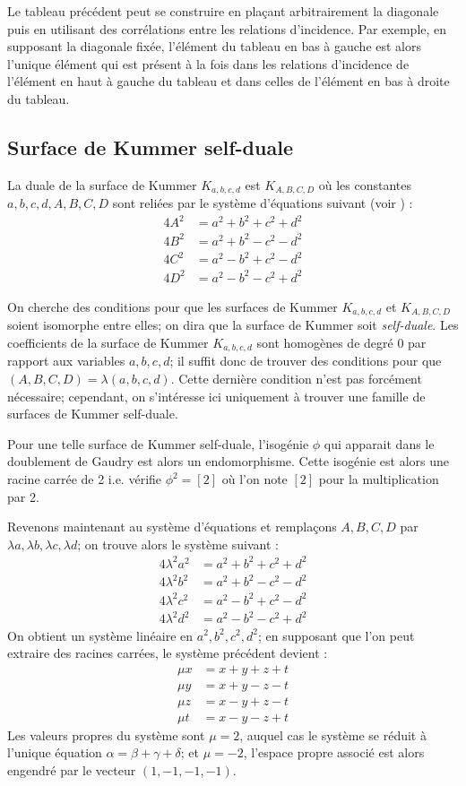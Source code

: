 \documentclass[a4paper]{article}
\theoremstyle{definition}
\theoremstyle{remark}
\numberwithin{equation}{section}
\begin{document}
Le tableau précédent peut se construire en plaçant arbitrairement la diagonale puis en utilisant des corrélations entre les relations d'incidence. Par exemple, en supposant la diagonale fixée, l'élément du tableau en bas à gauche est alors l'unique élément qui est présent à la fois dans les relations d'incidence de l'élément en haut à gauche du tableau et dans celles de l'élément en bas à droite du tableau.

\subsection{Surface de Kummer self-duale}
La duale de la surface de Kummer $K_{a,b,c,d}$ est $K_{A,B,C,D}$ où les constantes $a,b,c,d,A,B,C,D$ sont reliées par le système d'équations suivant (voir \citet{gaudry}) :
\begin{align*}
4A^2 &= a^2 + b^2 + c^2 + d^2 \\
4B^2 &= a^2 + b^2 - c^2 - d^2 \\
4C^2 &= a^2 - b^2 + c^2 - d^2 \\
4D^2 &= a^2 - b^2 - c^2 + d^2
\end{align*}

On cherche des conditions pour que les surfaces de Kummer $K_{a,b,c,d}$ et $K_{A,B,C,D}$ soient isomorphe entre elles; on dira que la surface de Kummer soit \emph{self-duale}. Les coefficients de la surface de Kummer $K_{a,b,c,d}$ sont homogènes de degré 0 par rapport aux variables $a,b,c,d$; il suffit donc de trouver des conditions pour que $(A,B,C,D)=\lambda(a,b,c,d)$. Cette dernière condition n'est pas forcément nécessaire; cependant, on s'intéresse ici uniquement à trouver une famille de surfaces de Kummer self-duale.

Pour une telle surface de Kummer self-duale, l'isogénie $\phi$ qui apparait dans le doublement de Gaudry est alors un endomorphisme. Cette isogénie est alors une racine carrée de 2 i.e. vérifie $\phi^2 = [2]$ où l'on note $[2]$ pour la multiplication par 2.

Revenons maintenant au système d'équations et remplaçons $A,B,C,D$ par $\lambda a,\lambda b,\lambda c,\lambda d$; on trouve alors le système suivant :
\begin{align*}
4\lambda^2a^2 &= a^2 + b^2 + c^2 + d^2 \\
4\lambda^2b^2 &= a^2 + b^2 - c^2 - d^2 \\
4\lambda^2c^2 &= a^2 - b^2 + c^2 - d^2 \\
4\lambda^2d^2 &= a^2 - b^2 - c^2 + d^2
\end{align*}
On obtient un système linéaire en $a^2,b^2,c^2,d^2$; en supposant que l'on peut extraire des racines carrées, le système précédent devient :
\begin{align*}
\mu x &= x + y +  z + t \\
\mu y &= x + y -  z - t \\
\mu z &= x - y +  z - t \\
\mu t &= x - y -  z + t
\end{align*}
Les valeurs propres du système sont $\mu = 2$, auquel cas le système se réduit à l'unique équation $\alpha = \beta + \gamma + \delta$; et $\mu = -2$, l'espace propre associé est alors engendré par le vecteur $(1,-1,-1,-1)$.
\end{document}
